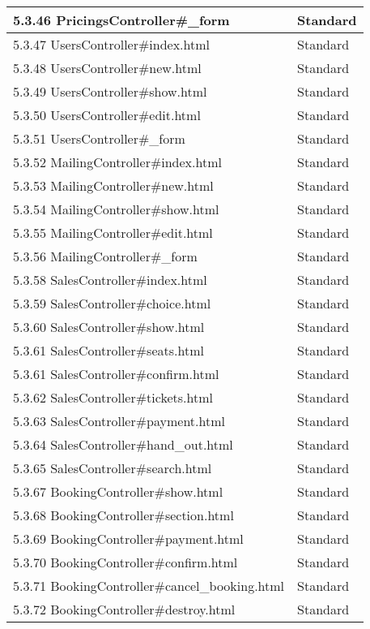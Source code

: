 \documentclass[a4paper, twoside, 11pt, titlepage]{article}
\begin{document}
\begin {table} [ht]
\begin{tabular} {  p{3.5cm} p{9.6cm} }
			\hline
			 5.3.46 PricingsController\#\_form  &  Standard   \\
			\hline
			 5.3.47 UsersController\#index.html  &  Standard   \\
			\hline
			 5.3.48 UsersController\#new.html  &  Standard   \\
			\hline
			 5.3.49 UsersController\#show.html  &  Standard   \\
			\hline
			 5.3.50 UsersController\#edit.html  &  Standard   \\
			\hline
			 5.3.51 UsersController\#\_form  &  Standard   \\
			\hline
			 5.3.52 MailingController\#index.html  &  Standard   \\
			\hline
			 5.3.53 MailingController\#new.html  &  Standard   \\
			\hline
			 5.3.54 MailingController\#show.html  &  Standard   \\
			\hline
			 5.3.55 MailingController\#edit.html  &  Standard   \\
			\hline
			 5.3.56 MailingController\#\_form  &  Standard   \\
			\hline
			 5.3.58 SalesController\#index.html  &  Standard   \\
			\hline
			 5.3.59 SalesController\#choice.html  &  Standard   \\
			\hline
			 5.3.60 SalesController\#show.html  &  Standard   \\
			\hline
			 5.3.61 SalesController\#seats.html  &  Standard   \\
			\hline
			 5.3.61 SalesController\#confirm.html  &  Standard   \\
			\hline
			 5.3.62 SalesController\#tickets.html  &  Standard   \\
			\hline
			 5.3.63 SalesController\#payment.html  &  Standard   \\
			\hline
			 5.3.64 SalesController\#hand\_out.html  &  Standard   \\
			\hline
			 5.3.65 SalesController\#search.html  &  Standard   \\
			\hline
			 5.3.67 BookingController\#show.html  &  Standard   \\
			\hline
			 5.3.68 BookingController\#section.html  &  Standard   \\
			\hline
			 5.3.69 BookingController\#payment.html  &  Standard   \\
			\hline
			 5.3.70 BookingController\#confirm.html  &  Standard   \\
			\hline
			 5.3.71 BookingController\#cancel\_booking.html  &  Standard   \\
			\hline
			 5.3.72 BookingController\#destroy.html  &  Standard   \\
			\hline
		\end{tabular} \end{table} \FloatBarrier
\end{document}
